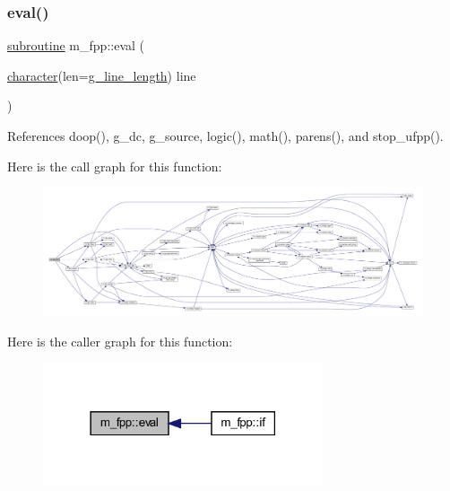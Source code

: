 \subsubsection{\texorpdfstring{eval()}{eval()}}
{\footnotesize\ttfamily \hyperlink{M__stopwatch_83_8txt_acfbcff50169d691ff02d4a123ed70482}{subroutine} m\+\_\+fpp\+::eval (\begin{DoxyParamCaption}\item[{\hyperlink{option__stopwatch_83_8txt_abd4b21fbbd175834027b5224bfe97e66}{character}(len=\hyperlink{namespacem__fpp_ab93f8756cf248cf8db932573009d4664}{g\+\_\+line\+\_\+length})}]{line }\end{DoxyParamCaption})}



References doop(), g\+\_\+dc, g\+\_\+source, logic(), math(), parens(), and stop\+\_\+ufpp().

Here is the call graph for this function\+:
\nopagebreak
\begin{figure}[H]
\begin{center}
\leavevmode
\includegraphics[width=350pt]{namespacem__fpp_a7f223128c476778fa0334675c1431371_cgraph}
\end{center}
\end{figure}
Here is the caller graph for this function\+:
\nopagebreak
\begin{figure}[H]
\begin{center}
\leavevmode
\includegraphics[width=234pt]{namespacem__fpp_a7f223128c476778fa0334675c1431371_icgraph}
\end{center}
\end{figure}
\mbox{\label{namespacem__fpp_a1149aa9cc5620d40fa315e4de3937776}} 
